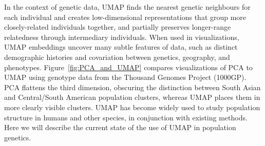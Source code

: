 In the context of genetic data, UMAP finds the nearest genetic neighbours for each individual and creates low-dimensional representations that group more closely-related individuals together, and partially preserves longer-range relatedness through intermediary individuals. When used in visualizations, UMAP embeddings uncover many subtle features of data, such as distinct demographic histories and covariation between genetics, geography, and phenotypes\citep{diaz-papkovich_umap_2019}. Figure~\ref{fig:PCA_and_UMAP} compares visualizations of PCA to UMAP using genotype data from the Thousand Genomes Project (1000GP)\citep{global_2015}. PCA flattens the third dimension, obscuring the distinction between South Asian and Central/South American population clusters, whereas UMAP places them in more clearly visible clusters. UMAP has become widely used to study population structure in humans and other species, in conjunction with existing methods. Here we will describe the current state of the use of UMAP in population genetics.
